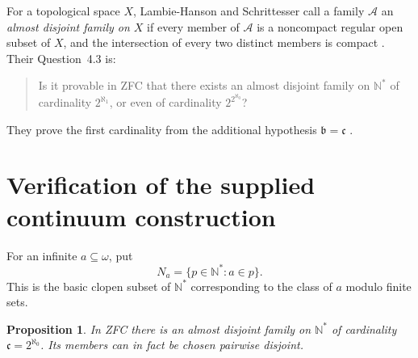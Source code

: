 \documentclass[11pt]{article}
\newtheorem{proposition}[theorem]{Proposition}
\theoremstyle{definition}
\theoremstyle{remark}
\newcommand{\AD}{\mathcal A}
\begin{document}
For a topological space \(X\), Lambie-Hanson and Schrittesser call a family
\(\AD\) an \emph{almost disjoint family on \(X\)} if every member of \(\AD\)
is a noncompact regular open subset of \(X\), and the intersection of every
two distinct members is compact \cite[Definition~2.1]{LHS}.
Their Question~4.3 is:
\begin{quote}
Is it provable in ZFC that there exists an almost disjoint family on
\(\mathbb N^*\) of cardinality \(2^{\aleph_1}\), or even of cardinality
\(2^{2^{\aleph_0}}\)?
\end{quote}
They prove the first cardinality from the additional hypothesis
\(\mathfrak b=\mathfrak c\) \cite[Theorem~C]{LHS}.

\section{Verification of the supplied continuum construction}

For an infinite \(a\subseteq\omega\), put
\[
  N_a=\{p\in\mathbb N^*:a\in p\}.
\]
This is the basic clopen subset of \(\mathbb N^*\) corresponding to the class
of \(a\) modulo finite sets.

\begin{proposition}\label{prop:continuum}
In ZFC there is an almost disjoint family on \(\mathbb N^*\) of cardinality
\(\mathfrak c=2^{\aleph_0}\).  Its members can in fact be chosen pairwise
disjoint.
\end{proposition}
\end{document}
